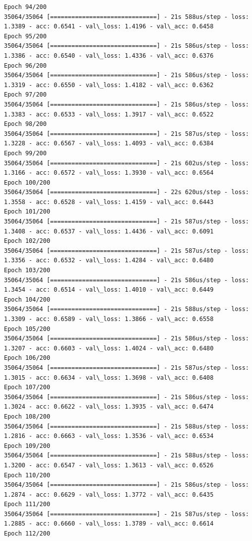 \documentclass[11pt]{article}
\begin{document}
\begin{Verbatim}[commandchars=\\\{\}]
Epoch 94/200
35064/35064 [==============================] - 21s 588us/step - loss: 1.3389 - acc: 0.6541 - val\_loss: 1.4196 - val\_acc: 0.6458
Epoch 95/200
35064/35064 [==============================] - 21s 586us/step - loss: 1.3386 - acc: 0.6540 - val\_loss: 1.4336 - val\_acc: 0.6376
Epoch 96/200
35064/35064 [==============================] - 21s 586us/step - loss: 1.3319 - acc: 0.6550 - val\_loss: 1.4182 - val\_acc: 0.6362
Epoch 97/200
35064/35064 [==============================] - 21s 586us/step - loss: 1.3383 - acc: 0.6533 - val\_loss: 1.3917 - val\_acc: 0.6522
Epoch 98/200
35064/35064 [==============================] - 21s 587us/step - loss: 1.3228 - acc: 0.6567 - val\_loss: 1.4093 - val\_acc: 0.6384
Epoch 99/200
35064/35064 [==============================] - 21s 602us/step - loss: 1.3166 - acc: 0.6572 - val\_loss: 1.3930 - val\_acc: 0.6564
Epoch 100/200
35064/35064 [==============================] - 22s 620us/step - loss: 1.3558 - acc: 0.6528 - val\_loss: 1.4159 - val\_acc: 0.6443
Epoch 101/200
35064/35064 [==============================] - 21s 587us/step - loss: 1.3408 - acc: 0.6537 - val\_loss: 1.4436 - val\_acc: 0.6091
Epoch 102/200
35064/35064 [==============================] - 21s 587us/step - loss: 1.3356 - acc: 0.6532 - val\_loss: 1.4284 - val\_acc: 0.6480
Epoch 103/200
35064/35064 [==============================] - 21s 586us/step - loss: 1.3454 - acc: 0.6514 - val\_loss: 1.4010 - val\_acc: 0.6449
Epoch 104/200
35064/35064 [==============================] - 21s 588us/step - loss: 1.3309 - acc: 0.6589 - val\_loss: 1.3866 - val\_acc: 0.6558
Epoch 105/200
35064/35064 [==============================] - 21s 586us/step - loss: 1.3207 - acc: 0.6603 - val\_loss: 1.4024 - val\_acc: 0.6480
Epoch 106/200
35064/35064 [==============================] - 21s 587us/step - loss: 1.3015 - acc: 0.6634 - val\_loss: 1.3698 - val\_acc: 0.6408
Epoch 107/200
35064/35064 [==============================] - 21s 586us/step - loss: 1.3024 - acc: 0.6622 - val\_loss: 1.3935 - val\_acc: 0.6474
Epoch 108/200
35064/35064 [==============================] - 21s 588us/step - loss: 1.2816 - acc: 0.6663 - val\_loss: 1.3536 - val\_acc: 0.6534
Epoch 109/200
35064/35064 [==============================] - 21s 588us/step - loss: 1.3200 - acc: 0.6547 - val\_loss: 1.3613 - val\_acc: 0.6526
Epoch 110/200
35064/35064 [==============================] - 21s 586us/step - loss: 1.2874 - acc: 0.6629 - val\_loss: 1.3772 - val\_acc: 0.6435
Epoch 111/200
35064/35064 [==============================] - 21s 587us/step - loss: 1.2885 - acc: 0.6660 - val\_loss: 1.3789 - val\_acc: 0.6614
Epoch 112/200

\end{Verbatim}
\end{document}
